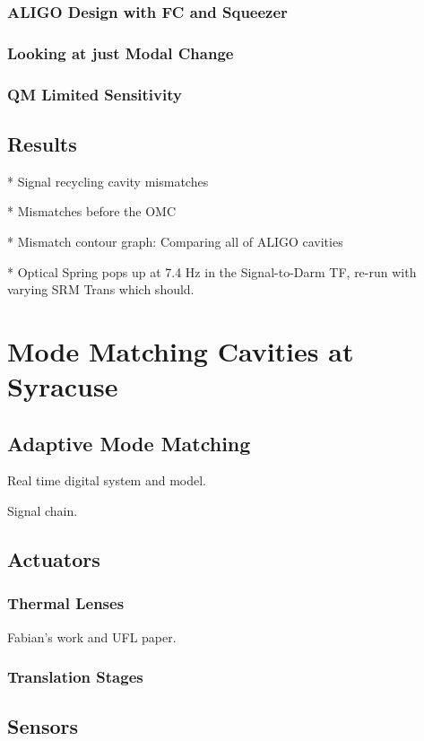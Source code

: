 \documentclass[10pt,a4paper]{book}
\begin{document}
		\subsection{ALIGO Design with FC and Squeezer}
		\subsection{Looking at just Modal Change}
		\subsection{QM Limited Sensitivity}
			
	\section{Results}
		* Signal recycling cavity mismatches

		* Mismatches before the OMC
			
		* Mismatch contour graph: Comparing all of ALIGO cavities
			
		* Optical Spring pops up at 7.4 Hz in the Signal-to-Darm TF, re-run with varying SRM Trans which should.

\chapter{Mode Matching Cavities at Syracuse}

	\section{Adaptive Mode Matching}
	Real time digital system and model.
	
	Signal chain.
	
	\section{Actuators}
		\subsection{Thermal Lenses}
		Fabian's work and UFL paper.
		\subsection{Translation Stages}
		
	\section{Sensors}
\end{document}
